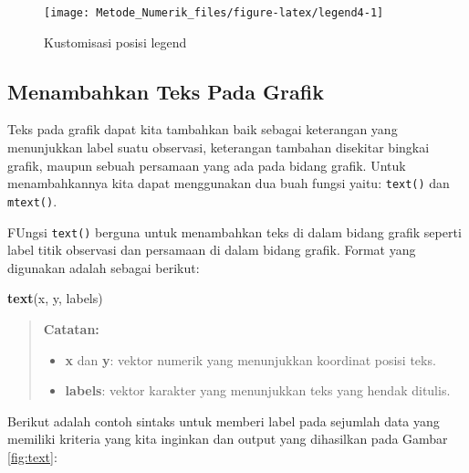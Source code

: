 \documentclass[
]{book}
\newenvironment{Shaded}{\begin{snugshade}}{\end{snugshade}}
\newcommand{\FunctionTok}[1]{\textcolor[rgb]{0.13,0.29,0.53}{\textbf{#1}}}
\newcommand{\NormalTok}[1]{#1}
\providecommand{\tightlist}{%
  \setlength{\itemsep}{0pt}\setlength{\parskip}{0pt}}
\theoremstyle{definition}
\theoremstyle{definition}
\theoremstyle{definition}
\theoremstyle{definition}
\theoremstyle{remark}
\begin{document}
\begin{figure}

{\centering \texttt{[image: Metode\_Numerik\_files/figure-latex/legend4-1]} 

}

\caption{Kustomisasi posisi legend}\label{fig:legend4}
\end{figure}

\hypertarget{addtext}{%
\subsection{Menambahkan Teks Pada Grafik}\label{addtext}}

Teks pada grafik dapat kita tambahkan baik sebagai keterangan yang menunjukkan label suatu observasi, keterangan tambahan disekitar bingkai grafik, maupun sebuah persamaan yang ada pada bidang grafik. Untuk menambahkannya kita dapat menggunakan dua buah fungsi yaitu: \texttt{text()} dan \texttt{mtext()}.

FUngsi \texttt{text()} berguna untuk menambahkan teks di dalam bidang grafik seperti label titik observasi dan persamaan di dalam bidang grafik. Format yang digunakan adalah sebagai berikut:

\begin{Shaded}
\begin{Highlighting}[]
\FunctionTok{text}\NormalTok{(x, y, labels)}
\end{Highlighting}
\end{Shaded}

\begin{quote}
\textbf{Catatan:}

\begin{itemize}
\tightlist
\item
  \textbf{x} dan \textbf{y}: vektor numerik yang menunjukkan koordinat posisi teks.
\item
  \textbf{labels}: vektor karakter yang menunjukkan teks yang hendak ditulis.
\end{itemize}
\end{quote}

Berikut adalah contoh sintaks untuk memberi label pada sejumlah data yang memiliki kriteria yang kita inginkan dan output yang dihasilkan pada Gambar \ref{fig:text}:
\end{document}

